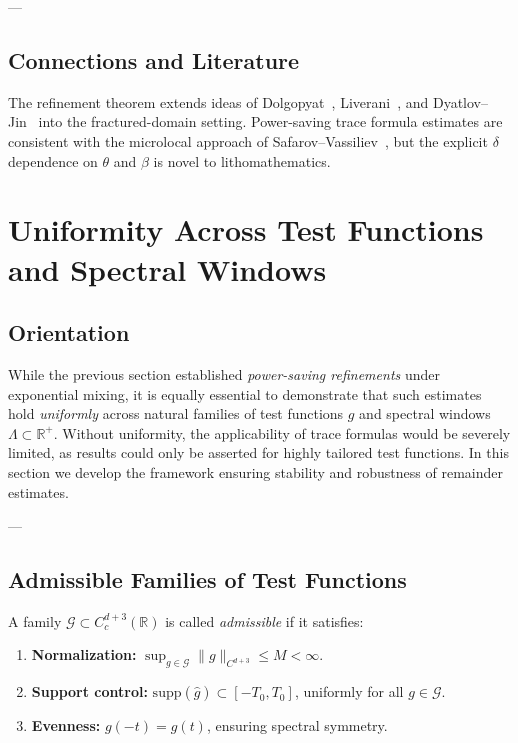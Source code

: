 ---

\subsection*{Connections and Literature}

The refinement theorem extends ideas of 
Dolgopyat~\cite{Dolgopyat1998}, Liverani~\cite{Liverani2004}, 
and Dyatlov--Jin~\cite{DyatlovJin2017} 
into the fractured-domain setting.  
Power-saving trace formula estimates are consistent with the 
microlocal approach of Safarov--Vassiliev~\cite{SafarovVassiliev1996}, 
but the explicit $\delta$ dependence on $\theta$ and $\beta$ 
is novel to lithomathematics.


\section{Uniformity Across Test Functions and Spectral Windows}
\label{sec:uniformity}

\subsection*{Orientation}
While the previous section established \emph{power-saving refinements} 
under exponential mixing, 
it is equally essential to demonstrate that such estimates hold 
\emph{uniformly} across natural families of test functions $g$ 
and spectral windows $\Lambda \subset \mathbb{R}^+$.  
Without uniformity, the applicability of trace formulas 
would be severely limited, 
as results could only be asserted for highly tailored test functions.  
In this section we develop the framework ensuring stability 
and robustness of remainder estimates.

---

\subsection{Admissible Families of Test Functions}

\begin{definition}
\label{def:test-family}
A family $\mathcal{G} \subset C_c^{d+3}(\mathbb{R})$ is called 
\emph{admissible} if it satisfies:
\begin{enumerate}[label=(\roman*)]
  \item \textbf{Normalization:} $\sup_{g \in \mathcal{G}} \|g\|_{C^{d+3}} \leq M < \infty$.
  \item \textbf{Support control:} $\mathrm{supp}(\widehat{g}) \subset [-T_0, T_0]$, 
        uniformly for all $g \in \mathcal{G}$.
  \item \textbf{Evenness:} $g(-t) = g(t)$, ensuring spectral symmetry.
\end{enumerate}
\end{definition}

